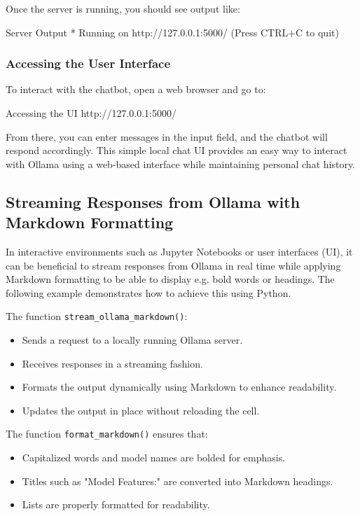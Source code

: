 Once the server is running, you should see output like:

\begin{codeonly}{Server Output}
 * Running on http://127.0.0.1:5000/ (Press CTRL+C to quit)
\end{codeonly}

\subsubsection{Accessing the User Interface}

To interact with the chatbot, open a web browser and go to:

\begin{codeonly}{Accessing the UI}
http://127.0.0.1:5000/
\end{codeonly}

From there, you can enter messages in the input field, and the chatbot will respond accordingly.
This simple local chat UI provides an easy way to interact with Ollama using a web-based interface while maintaining personal chat history.

%
\subsection{Streaming Responses from Ollama with Markdown Formatting}

In interactive environments such as Jupyter Notebooks or user interfaces (UI), it can be beneficial to stream responses from Ollama in real time while applying Markdown formatting to be able to display e.g. bold words or headings. The following example demonstrates how to achieve this using Python.

The function \texttt{stream\_ollama\_markdown()}:
\begin{itemize}
    \item Sends a request to a locally running Ollama server.
    \item Receives responses in a streaming fashion.
    \item Formats the output dynamically using Markdown to enhance readability.
    \item Updates the output in place without reloading the cell.
\end{itemize}

The function \texttt{format\_markdown()} ensures that:
\begin{itemize}
    \item Capitalized words and model names are bolded for emphasis.
    \item Titles such as "Model Features:" are converted into Markdown headings.
    \item Lists are properly formatted for readability.
\end{itemize}


